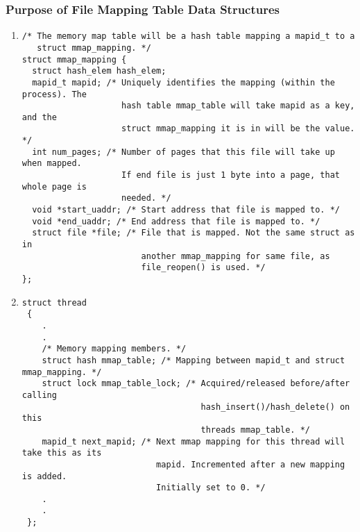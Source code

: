 \documentclass{article}
\renewcommand{\_}{\char`_}
\begin{document}
\subsubsection{Purpose of File Mapping Table Data Structures}
\begin{enumerate}

\item

\begin{lstlisting}
/* The memory map table will be a hash table mapping a mapid_t to a
   struct mmap_mapping. */
struct mmap_mapping {
  struct hash_elem hash_elem;
  mapid_t mapid; /* Uniquely identifies the mapping (within the process). The
                    hash table mmap_table will take mapid as a key, and the
                    struct mmap_mapping it is in will be the value. */
  int num_pages; /* Number of pages that this file will take up when mapped.
                    If end file is just 1 byte into a page, that whole page is
                    needed. */
  void *start_uaddr; /* Start address that file is mapped to. */
  void *end_uaddr; /* End address that file is mapped to. */
  struct file *file; /* File that is mapped. Not the same struct as in
                        another mmap_mapping for same file, as
                        file_reopen() is used. */
};
\end{lstlisting}

\item

\begin{lstlisting}
struct thread 
 {
    .
    .
    /* Memory mapping members. */
    struct hash mmap_table; /* Mapping between mapid_t and struct mmap_mapping. */
    struct lock mmap_table_lock; /* Acquired/released before/after calling
                                    hash_insert()/hash_delete() on this
                                    threads mmap_table. */
    mapid_t next_mapid; /* Next mmap mapping for this thread will take this as its
                           mapid. Incremented after a new mapping is added.
                           Initially set to 0. */
    .
    .
 };
\end{lstlisting}

\end{enumerate}
\end{document}
